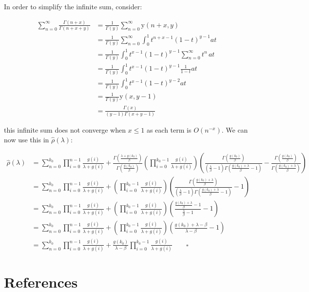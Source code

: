 \documentclass[
  sn-basic,
]{sn-jnl}
\theoremstyle{plain}
\theoremstyle{remark}
\begin{document}
In order to simplify the infinite sum, consider:

\begin{align*}
\sum_{n=0}^\infty\frac{\Gamma(n+x)}{\Gamma(n+x+y)} &=\frac{1}{\Gamma(y)}\sum_{n=0}^\infty \text{y}(n+x,y)\\
&=\frac{1}{\Gamma(y)}\sum_{n=0}^\infty\int_0^1t^{n+x-1}(1-t)^{y-1}at\\
&=\frac{1}{\Gamma(y)}\int_0^1 t^{x-1}(1-t)^{y-1}\sum_{n=0}^\infty t^n\,at\\
&=\frac{1}{\Gamma(y)}\int_0^1 t^{x-1}(1-t)^{y-1}\frac{1}{1-t}at\\
&=\frac{1}{\Gamma(y)}\int_0^1 t^{x-1}(1-t)^{y-2}at\\
&=\frac{1}{\Gamma(y)}\text{y}(x,y-1)\\
&= \frac{\Gamma(x)}{(y-1)\Gamma(x+y-1)}
\end{align*}

this infinite sum does not converge when \(x\le1\) as each term is
\(O(n^{-x})\). We can now use this in \(\hat\rho(\lambda)\):

\begin{align*}
\hat\rho(\lambda) &= \sum_{n=0}^{k_0}\prod_{i=0}^{n-1}\frac{g(i)}{\lambda+g(i)} + \frac{\Gamma\left(\frac{\lambda+g(k_0)}{\beta}\right)}{\Gamma\left(\frac{g(k_0)}{\beta}\right)}\left(\prod_{i=0}^{k_0-1}\frac{g(i)}{\lambda+g(i)}\right)\left(\frac{\Gamma\left(\frac{g(k_0)}{\beta}\right)}{\left(\frac{\lambda}{\beta}-1\right)\Gamma\left(\frac{g(k_0)+\lambda}{\beta}-1\right)}-\frac{\Gamma\left(\frac{g(k_0)}{\beta}\right)}{\Gamma\left(\frac{g(k_0)+\lambda}{\beta}\right)}\right)\\
&=\sum_{n=0}^{k_0}\prod_{i=0}^{n-1}\frac{g(i)}{\lambda+g(i)} + \left(\prod_{i=0}^{k_0-1}\frac{g(i)}{\lambda+g(i)}\right)\left(\frac{\Gamma\left(\frac{g(k_0)+\lambda}{\beta}\right)}{\left(\frac{\lambda}{\beta}-1\right)\Gamma\left(\frac{g(k_0)+\lambda}{\beta}-1\right)}-1\right)\\
&=\sum_{n=0}^{k_0}\prod_{i=0}^{n-1}\frac{g(i)}{\lambda+g(i)} + \left(\prod_{i=0}^{k_0-1}\frac{g(i)}{\lambda+g(i)}\right)\left(\frac{\frac{g(k_0)+\lambda}{\beta}-1}{\frac{\lambda}{\beta}-1}-1\right)\\
&=\sum_{n=0}^{k_0}\prod_{i=0}^{n-1}\frac{g(i)}{\lambda+g(i)} + \left(\prod_{i=0}^{k_0-1}\frac{g(i)}{\lambda+g(i)}\right)\left(\frac{g(k_0)+\lambda-\beta}{\lambda-\beta}-1\right)\\&=\sum_{n=0}^{k_0}\prod_{i=0}^{n-1}\frac{g(i)}{\lambda+g(i)} + \frac{g(k_0)}{\lambda-\beta}\prod_{i=0}^{k_0-1}\frac{g(i)}{\lambda+g(i)}\qquad \square
\end{align*}

\section{References}\label{references}

\renewcommand{\bibsection}{}

\end{document}
